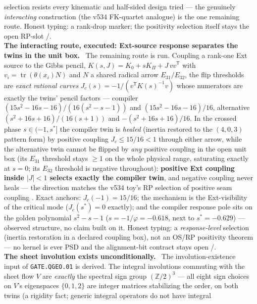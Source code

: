 \documentclass[11pt,a4paper]{article}
\theoremstyle{definition}
\begin{document}
\begin{winbox}
selection resists every kinematic and half-sided design tried --- the genuinely
\emph{interacting} construction (the v534 FK-quartet analogue) is the one remaining route.
Honest typing: a rank-drop marker; the positivity selection itself stays the open RP-slot
\mE/\mO.
\smallskip\\
\noindent\textbf{The interacting route, executed: Ext-source response separates the twins in
the unit box.} \ The remaining route is run.  Coupling a
rank-one Ext source to the Gibbs pencil, $K(s,J)=K_0+sK_\Pi+J\,vv^{\mathsf T}$ with
$v_i=\operatorname{tr}(\theta(x_i)N)$ and $N$ a shared radical arrow $E_{31}/E_{32}$, the flip
thresholds are \emph{exact rational curves} $J_c(s)=-1/(v^{\mathsf T}K(s)^{-1}v)$ whose
numerators are exactly the twins' pencil factors --- compiler
$(15s^2{-}16s{-}16)/(16(s^2{-}s{-}1))$ and $(15s^2{-}16s{-}16)/16$, alternative
$(s^2{+}16s{+}16)/(16(s{+}1))$ and $-(s^2{+}16s{+}16)/16$.  In the crossed phase
$s\in(-1,s^*]$ the compiler twin is \emph{healed} (inertia restored to the $(4,0,3)$ pattern
form) by positive coupling $J_c\le 15/16<1$ through either arrow, while the alternative twin
cannot be flipped by \emph{any} positive coupling in the open unit box (its $E_{31}$ threshold
stays $\ge1$ on the whole physical range, saturating exactly at $s=0$; its $E_{32}$ threshold
is negative throughout): \textbf{positive Ext coupling inside $|J|<1$ selects exactly the
compiler twin}, and negative coupling never heals --- the direction matches the v534 toy's RP
selection of positive seam coupling \mE.  Exact anchors: $J_c(-1)=15/16$; the mechanism is the
Ext-visibility of the critical mode ($J_c(s^*)=0$ exactly); and the compiler response pole
sits on the golden polynomial $s^2-s-1$ ($s=-1/\varphi=-0.618$, next to $s^*=-0.629$) ---
observed structure, no claim built on it.  Honest typing: a \emph{response-level} selection
(inertia restoration in a declared coupling box), not an OS/RP positivity theorem --- no
kernel is ever PSD and the alignment-bit contract stays open \mE/\mC.
\smallskip\\
\noindent\textbf{The sheet involution exists unconditionally.}
\ The involution-existence input of
\texttt{GATE.QGEO.01} is derived.  The integral involutions commuting
with the sheet flow $V$ are \emph{exactly} the spectral sign group
$(\mathbb{Z}/2)^3$ --- all eight sign choices on $V$'s eigenspaces
$\{0,1,2\}$ are integer matrices stabilizing the order, on both twins
(a rigidity fact; generic integral operators do not have integral

\end{winbox}
\end{document}
